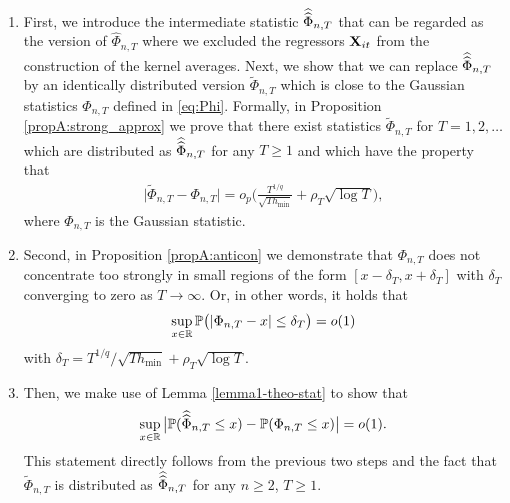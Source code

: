 \begin{enumerate}
\item First, we introduce the intermediate statistic $\widehat{\widehat{\Phi}}_{n, T}$ that can be regarded as the version of $\widehat{\Phi}_{n, T}$ where we excluded the regressors $\mathbf{X}_{it}$ from the construction of the kernel averages. Next, we show that we can replace $\widehat{\widehat{\Phi}}_{n, T}$ by an identically distributed version $\widetilde{\Phi}_{n, T}$ which is close to the Gaussian statistics $\Phi_{n, T}$ defined in \eqref{eq:Phi}. Formally, in Proposition \ref{propA:strong_approx} we prove that there exist statistics $\widetilde{\Phi}_{n, T}$ for $T = 1,2,\ldots$ which are distributed as $\widehat{\widehat{\Phi}}_{n, T}$ for any $T \ge 1$ and which have the property that 
\begin{align*}
\big| \widetilde{\Phi}_{n, T} - \Phi_{n,T} \big| = o_p \Big( \frac{T^{1/q}}{\sqrt{T h_{\min}}} + \rho_T\sqrt{\log T} \Big),
\end{align*}
where $\Phi_{n, T}$ is the Gaussian statistic.

\item Second, in Proposition \ref{propA:anticon} we demonstrate that $\Phi_{n,T}$ does not concentrate too strongly in small regions of the form $[x-\delta_T,x+\delta_T]$ with $\delta_T$ converging to zero as $T\to \infty$. Or, in other words, it holds that 
\begin{align*}
\sup_{x \in \mathbb{R}} \mathbb{P} \big( | \Phi_{n,T} - x | \le \delta_T \big) = o(1)
\end{align*}
with $\delta_T = T^{1/q} / \sqrt{T h_{\min}} + \rho_T \sqrt{\log T}$.
\item Then, we make use of Lemma \ref{lemma1-theo-stat} to show that
\begin{equation*}
\sup_{x \in \mathbb{R}} \big| \mathbb{P}(\widehat{\widehat{\Phi}}_{n, T} \le x) - \mathbb{P}(\Phi_{n,T} \le x) \big| = o(1). 
\end{equation*}
This statement directly follows from the previous two steps and the fact that $\widetilde{\Phi}_{n, T}$ is distributed as $\widehat{\widehat{\Phi}}_{n, T}$ for any $n \ge 2$, $T \ge 1$.


\end{enumerate}
